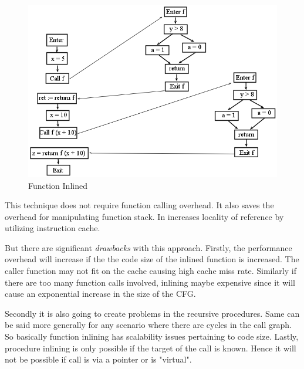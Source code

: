 \documentclass[12pt,oneside]{book}
\begin{document}
\begin{figure}[htbp]
\centering
\includegraphics[scale=0.5]{inlineCFG.png}
\caption{Function Inlined}
\end{figure}

This technique does not require function calling overhead. It also saves the overhead for manipulating function stack. In increases locality of reference by utilizing instruction cache.

But there are significant \textit{drawbacks} with this approach. Firstly, the performance overhead will increase if the the code size of the inlined function is increased. The caller function may not fit on the cache causing high cache miss rate. Similarly if there are too many function calls involved, inlining maybe expensive since it will cause an exponential increase in the size of the CFG.

Secondly it is also going to create problems in the recursive procedures. Same can be said more generally for any scenario where there are cycles in the call graph. So basically function inlining has scalability issues pertaining to code size. Lastly, procedure inlining is only possible if the target of the call is known. Hence it will not be possible if call is via a pointer or is "virtual".

\end{document}
